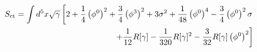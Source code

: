 \documentclass[12pt]{article}
\begin{document}
\begin{eqnarray}
S_{\mathrm{ct}} = \int d^5 x \sqrt{\gamma} \left[2 + {1 \over 4} \left(\phi^0\right)^2 + {3 \over 4} \left(\phi^3\right)^2 + 3 \sigma^2 +{1 \over 48 }\left(\phi^0\right)^4 - {3 \over 4} \left(\phi^0\right)^2 \sigma\right.
\nonumber\\
\vphantom{.}\hspace{1.4 in}\left. + {1 \over 12} R[\gamma] - {1 \over 320} R[\gamma]^2 - {3 \over 32} R[\gamma] \left(\phi^0\right)^2 \right]
\end{eqnarray}
\end{document}
